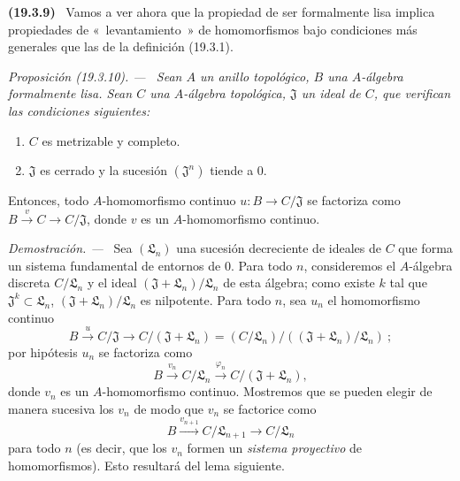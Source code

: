 \documentclass[10pt,oneside]{book}
\makeatletter
\newcommand{\setmanualcurrentlabel}[1]{\def\@currentlabel{#1}}
\newcommand{\oldpage}[2][]{%
  \setcounter{footnote}{0}%
  \marginpar{\scriptsize\textbf{#1}~|~#2}\ignorespaces}
\newenvironment{env}[1][]{\setmanualcurrentlabel{#1}\par\medskip\noindent\textbf{(#1)}\ }{\par}
\newenvironment{proposition}[1][]{%
  \setmanualcurrentlabel{#1}\par\medskip\noindent\itshape Proposición (#1). ---\ }{\par}
\newenvironment{proof}{%
  \par\medskip\noindent\textit{Demostración. ---\ }}{\par}
\makeatother
\begin{document}
\begin{env}[19.3.9]
\label{0.19.3.9-es}
Vamos a ver ahora que la propiedad de ser formalmente lisa
implica propiedades de «~levantamiento~» de homomorfismos bajo condiciones
más generales que las de la definición (19.3.1).
\end{env}

\oldpage[0\textsubscript{IV-1}]{84}

\begin{proposition}[19.3.10]
\label{0.19.3.10-es}
Sean $A$ un anillo topológico, $B$ una $A$-álgebra formalmente lisa.
Sean $C$ una $A$-álgebra topológica, $\mathfrak J$ un ideal de $C$,
que verifican las condiciones siguientes:
\begin{enumerate}
  \item[$1^\circ$] $C$ es metrizable y completo.
  \item[$2^\circ$] $\mathfrak J$ es cerrado y la sucesión
  $(\mathfrak J^n)$ tiende a $0$.
\end{enumerate}
Entonces, todo $A$-homomorfismo continuo $u:B\to C/\mathfrak J$ se factoriza como
$B\xrightarrow{v}C\to C/\mathfrak J$, donde $v$ es un
$A$-homomorfismo continuo.
\end{proposition}

\begin{proof}
Sea $(\mathfrak L_n)$ una sucesión decreciente de ideales de $C$ que forma un
sistema fundamental de entornos de $0$. Para todo $n$, consideremos el
$A$-álgebra discreta $C/\mathfrak L_n$ y el ideal
$(\mathfrak J+\mathfrak L_n)/\mathfrak L_n$ de esta álgebra; como
existe $k$ tal que $\mathfrak J^k\subset\mathfrak L_n$,
$(\mathfrak J+\mathfrak L_n)/\mathfrak L_n$ es nilpotente. Para todo
$n$, sea $u_n$ el homomorfismo continuo
\[
  B\xrightarrow{u}C/\mathfrak J\to C/(\mathfrak J+\mathfrak L_n)
  =(C/\mathfrak L_n)/((\mathfrak J+\mathfrak L_n)/\mathfrak L_n)~;
\]
por hipótesis $u_n$ se factoriza como
\[
  B\xrightarrow{v_n}C/\mathfrak L_n
  \xrightarrow{\varphi_n}C/(\mathfrak J+\mathfrak L_n),
\]
donde $v_n$ es un $A$-homomorfismo continuo. Mostremos que se pueden elegir de
manera sucesiva los $v_n$ de modo que $v_n$ se factorice como
\[
  B\xrightarrow{v_{n+1}}C/\mathfrak L_{n+1}\to C/\mathfrak L_n
\]
para todo $n$ (es decir, que los $v_n$ formen un \emph{sistema
proyectivo} de homomorfismos). Esto resultará del lema siguiente.
\end{proof}
\end{document}

